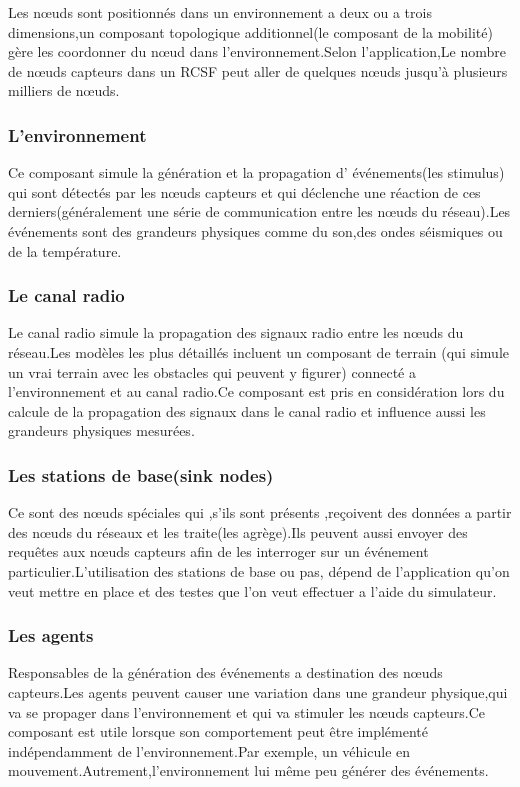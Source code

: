 Les nœuds sont positionnés dans un environnement a deux ou a trois dimensions,un composant topologique additionnel(le composant de la mobilité) gère les coordonner du nœud dans l'environnement.Selon l'application,Le nombre de nœuds capteurs dans un RCSF  peut aller de quelques nœuds jusqu'à plusieurs milliers de nœuds.
\subsubsection{L'environnement}
Ce composant simule la génération et la propagation d' événements(les stimulus) qui sont détectés par les nœuds capteurs et qui déclenche une réaction de ces derniers(généralement une série de communication entre les nœuds du réseau).Les événements sont des grandeurs physiques comme du son,des ondes séismiques ou de la température.
\subsubsection{Le canal radio}
Le canal radio  simule la propagation des signaux radio entre les nœuds du réseau.Les modèles les plus détaillés incluent un composant de terrain (qui simule un vrai terrain avec les obstacles qui peuvent y figurer) connecté a l'environnement et au canal radio.Ce composant est pris en considération lors du calcule de la propagation des signaux dans le canal radio et influence aussi les grandeurs physiques mesurées.

\subsubsection{Les stations de base(sink nodes)}
Ce sont des nœuds spéciales qui ,s'ils sont présents ,reçoivent des données a partir des nœuds du réseaux et les traite(les agrège).Ils peuvent aussi envoyer des requêtes aux nœuds capteurs
afin de les interroger sur un événement particulier.L'utilisation des stations de base ou pas, dépend de l'application qu'on veut mettre en place et des testes que l'on veut effectuer a l'aide du simulateur.

\subsubsection{Les agents}
Responsables de la génération des événements a destination des nœuds capteurs.Les agents peuvent causer une variation dans une grandeur physique,qui va se propager dans l'environnement et qui va stimuler les nœuds capteurs.Ce composant est utile lorsque son comportement peut être implémenté indépendamment de  l'environnement.Par exemple, un véhicule en mouvement.Autrement,l'environnement lui même peu générer des événements. 

